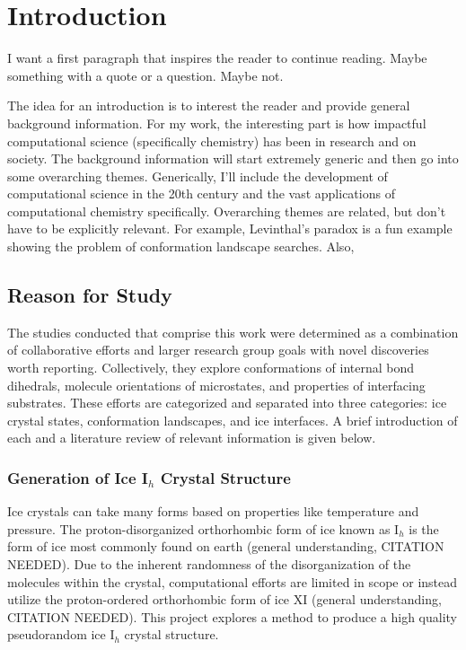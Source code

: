 \chapter{Introduction}
\label{ch:Introduction}

I want a first paragraph that inspires the reader to continue reading. Maybe something with a quote or a question. Maybe not.

The idea for an introduction is to interest the reader and provide general background information. 
For my work, the interesting part is how impactful computational science (specifically chemistry) has been in research and on society. 
The background information will start extremely generic and then go into some overarching themes. 
Generically, I'll include the development of computational science in the 20th century and the vast applications of computational chemistry specifically. 
Overarching themes are related, but don't have to be explicitly relevant. 
For example, Levinthal's paradox is a fun example showing the problem of conformation landscape searches.
Also, 

\section{Reason for Study}

The studies conducted that comprise this work were determined as a combination of collaborative efforts and larger research group goals with novel discoveries worth reporting.
Collectively, they explore conformations of internal bond dihedrals, molecule orientations of microstates, and properties of interfacing substrates.
These efforts are categorized and separated into three categories: ice crystal states, conformation landscapes, and ice interfaces. 
A brief introduction of each and a literature review of relevant information is given below.

\subsection{Generation of Ice I$_{h}$ Crystal Structure}

Ice crystals can take many forms based on properties like temperature and pressure. 
The proton-disorganized orthorhombic form of ice known as I$_{h}$ is the form of ice most commonly found on earth (general understanding, CITATION NEEDED). 
Due to the inherent randomness of the disorganization of the molecules within the crystal, computational efforts are limited in scope or instead utilize the proton-ordered orthorhombic form of ice XI  (general understanding, CITATION NEEDED).
This project explores a method to produce a high quality pseudorandom ice I$_{h}$ crystal structure.

